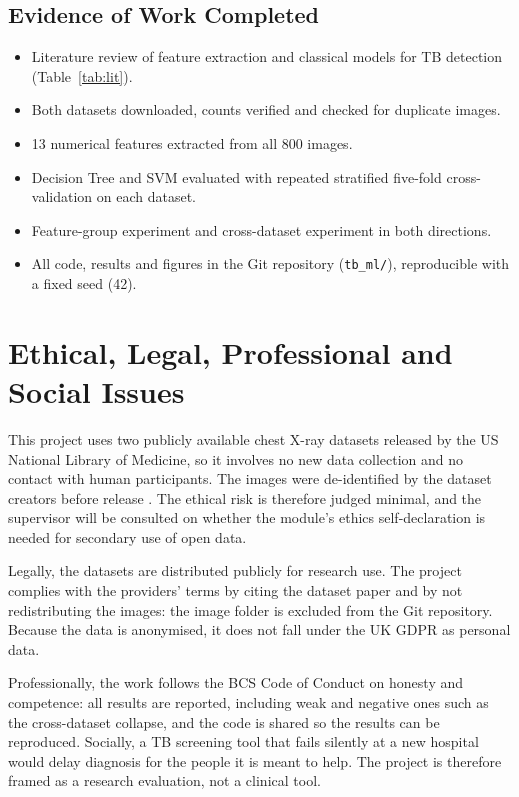 \documentclass[11pt,a4paper]{article}
\begin{document}
\subsection{Evidence of Work Completed}
\begin{itemize}\itemsep2pt
  \item Literature review of feature extraction and classical models for TB detection (Table~\ref{tab:lit}).
  \item Both datasets downloaded, counts verified and checked for duplicate images.
  \item 13 numerical features extracted from all 800 images.
  \item Decision Tree and SVM evaluated with repeated stratified five-fold cross-validation on each dataset.
  \item Feature-group experiment and cross-dataset experiment in both directions.
  \item All code, results and figures in the Git repository (\texttt{tb\_ml/}), reproducible with a fixed seed (42).
\end{itemize}

\section{Ethical, Legal, Professional and Social Issues}
This project uses two publicly available chest X-ray datasets released by the US National Library of Medicine, so it involves no new data collection and no contact with human participants. The images were de-identified by the dataset creators before release \citep{jaeger2014}. The ethical risk is therefore judged minimal, and the supervisor will be consulted on whether the module's ethics self-declaration is needed for secondary use of open data.

Legally, the datasets are distributed publicly for research use. The project complies with the providers' terms by citing the dataset paper and by not redistributing the images: the image folder is excluded from the Git repository. Because the data is anonymised, it does not fall under the UK GDPR as personal data.

Professionally, the work follows the BCS Code of Conduct on honesty and competence: all results are reported, including weak and negative ones such as the cross-dataset collapse, and the code is shared so the results can be reproduced. Socially, a TB screening tool that fails silently at a new hospital would delay diagnosis for the people it is meant to help. The project is therefore framed as a research evaluation, not a clinical tool.
\end{document}
